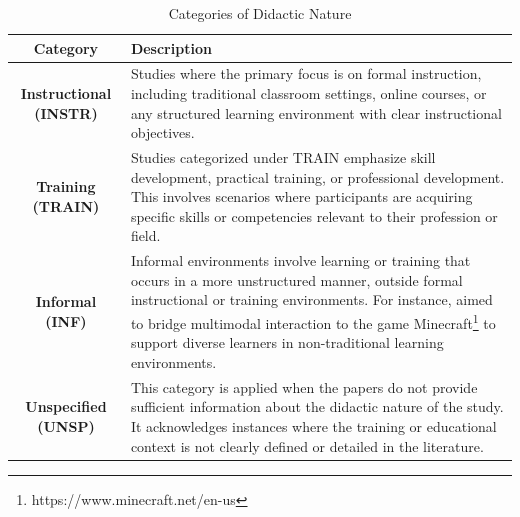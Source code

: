 \documentclass[manuscript,screen,review]{acmart}
\begin{document}
    

\begin{table}[ht]
    \caption{Categories of Didactic Nature}
    \centering
    \begin{tabular}{|c|p{}|}
        \hline
        \textbf{Category} & \textbf{Description} \\
        \hline
        \textbf{Instructional (INSTR)} & Studies where the primary focus is on formal instruction, including traditional classroom settings, online courses, or any structured learning environment with clear instructional objectives. \\
        \hline
        \textbf{Training (TRAIN)} & Studies categorized under TRAIN emphasize skill development, practical training, or professional development. This involves scenarios where participants are acquiring specific skills or competencies relevant to their profession or field. \\
        \hline
        \textbf{Informal (INF)} & Informal environments involve learning or training that occurs in a more unstructured manner, outside formal instructional or training environments. For instance, \citet{666050348} aimed to bridge multimodal interaction to the game Minecraft\footnote{https://www.minecraft.net/en-us} to support diverse learners in non-traditional learning environments. \\
        \hline
        \textbf{Unspecified (UNSP)} & This category is applied when the papers do not provide sufficient information about the didactic nature of the study. It acknowledges instances where the training or educational context is not clearly defined or detailed in the literature. \\
        \hline
    \end{tabular}
    \label{tab:didatic-nature}
\end{table}
\end{document}
